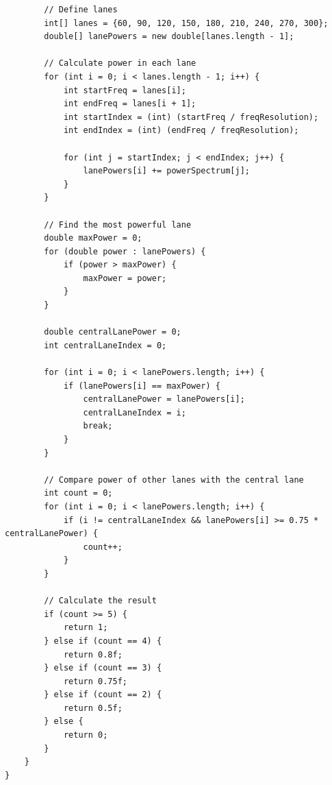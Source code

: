 \documentclass[12pt,a4paper]{article}
\begin{document}
\begin{lstlisting}
        // Define lanes
        int[] lanes = {60, 90, 120, 150, 180, 210, 240, 270, 300};
        double[] lanePowers = new double[lanes.length - 1];

        // Calculate power in each lane
        for (int i = 0; i < lanes.length - 1; i++) {
            int startFreq = lanes[i];
            int endFreq = lanes[i + 1];
            int startIndex = (int) (startFreq / freqResolution);
            int endIndex = (int) (endFreq / freqResolution);

            for (int j = startIndex; j < endIndex; j++) {
                lanePowers[i] += powerSpectrum[j];
            }
        }

        // Find the most powerful lane
        double maxPower = 0;
        for (double power : lanePowers) {
            if (power > maxPower) {
                maxPower = power;
            }
        }

        double centralLanePower = 0;
        int centralLaneIndex = 0;

        for (int i = 0; i < lanePowers.length; i++) {
            if (lanePowers[i] == maxPower) {
                centralLanePower = lanePowers[i];
                centralLaneIndex = i;
                break;
            }
        }

        // Compare power of other lanes with the central lane
        int count = 0;
        for (int i = 0; i < lanePowers.length; i++) {
            if (i != centralLaneIndex && lanePowers[i] >= 0.75 * centralLanePower) {
                count++;
            }
        }

        // Calculate the result
        if (count >= 5) {
            return 1;
        } else if (count == 4) {
            return 0.8f;
        } else if (count == 3) {
            return 0.75f;
        } else if (count == 2) {
            return 0.5f;
        } else {
            return 0;
        }
    }
}
\end{lstlisting}
\end{document}
